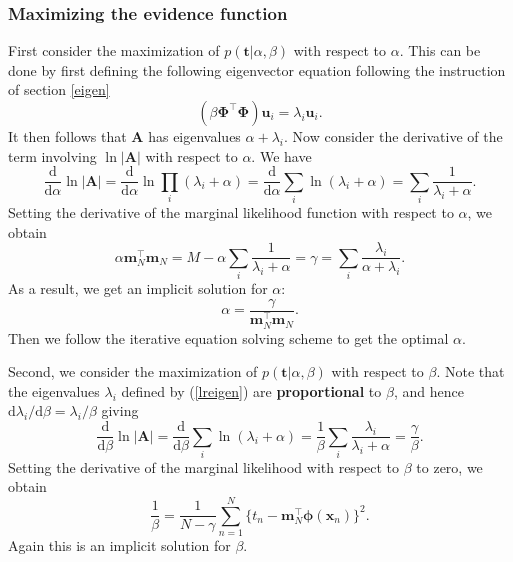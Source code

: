 \documentclass[a4paper]{book}
\newcommand{\ud}{\mathrm{d}}
\renewcommand{\bf}{\mathbf}
\newcommand{\bs}{\boldsymbol}
\begin{document}
\subsubsection{Maximizing the evidence function}\label{DEigens}
First consider the maximization of $p(\bf{t}|\alpha,\beta)$ with respect to $\alpha$. This can be done by first defining the following eigenvector equation following the instruction of section \ref{eigen}
\begin{equation}
(\beta \bs{\Phi}^{\intercal} \bs{\Phi})\bf{u}_i = \lambda_i \bf{u}_i. \label{lreigen}
\end{equation}
It then follows that $\bf{A}$ has eigenvalues $\alpha + \lambda_i$. Now consider the derivative of the term involving $\ln |\bf{A}|$ with respect to $\alpha$. We have
\begin{equation}
	\frac{\ud}{\ud \alpha}\ln |\bf{A}| = \frac{\ud}{\ud \alpha}\ln \prod_i(\lambda_i+\alpha)=\frac{\ud}{\ud \alpha}\sum_i \ln(\lambda_i+\alpha)=\sum_i \frac{1}{\lambda_i+\alpha}.
\end{equation}
Setting the derivative of the marginal likelihood function with respect to $\alpha$, we obtain
\begin{equation}
	\alpha \bf{m}_N^{\intercal} \bf{m}_N = M - \alpha \sum_i \frac{1}{\lambda_i+\alpha} = \gamma = \sum_i \frac{\lambda_i}{\alpha+\lambda_i}.
\end{equation}
As a result, we get an implicit solution for $\alpha$:
\begin{equation}
	\alpha = \frac{\gamma}{\bf{m}_N^{\intercal} \bf{m}_N}.
\end{equation}
Then we follow the iterative equation solving scheme to get the optimal $\alpha$.

Second, we consider the maximization of $p(\bf{t}|\alpha,\beta)$ with respect to $\beta$. Note that the eigenvalues $\lambda_i$ defined by (\ref{lreigen}) are \textbf{proportional} to $\beta$, and hence $\ud \lambda_i / \ud \beta = \lambda_i /\beta$ giving
\begin{equation}
	\frac{\ud}{\ud \beta} \ln |\bf{A}| = \frac{\ud}{\ud \beta}\sum_i \ln(\lambda_i+\alpha)=\frac{1}{\beta}\sum_i \frac{\lambda_i}{\lambda_i+\alpha} = \frac{\gamma}{\beta}.
\end{equation}
Setting the derivative of the marginal likelihood with respect to $\beta$ to zero, we obtain
\begin{equation}
	\frac{1}{\beta} = \frac{1}{N-\gamma} \sum_{n=1}^N \{ t_n - \bf{m}_N^{\intercal} \bs{\phi}(\bf{x}_n) \}^2.
\end{equation}
Again this is an implicit solution for $\beta$.
\end{document}
